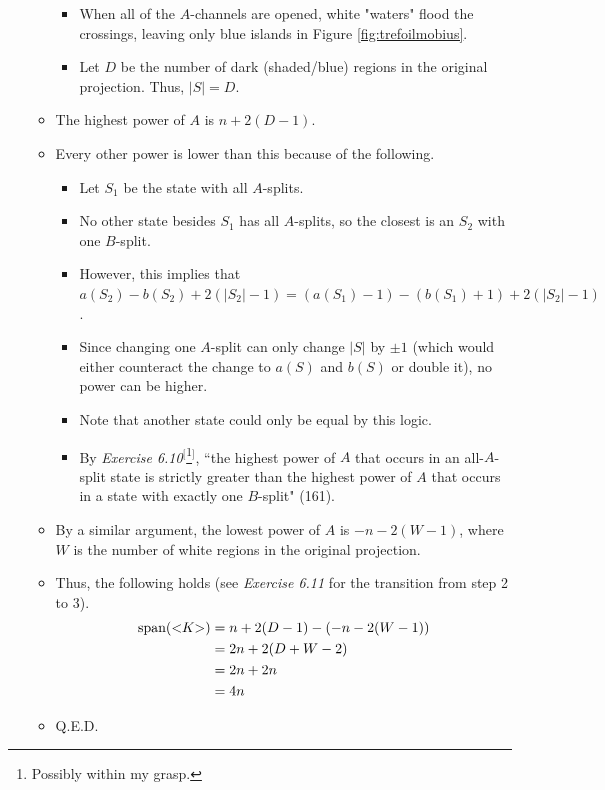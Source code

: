 \documentclass[titlepage]{article}
\numberwithin{figure}{section}
\numberwithin{table}{section}
\numberwithin{equation}{section}
\newcommand{\dq}[2]{``#1" (#2).}
\newcommand{\lbq}{<\hspace{-3pt}}
\newcommand{\rbq}{\hspace{-3pt}>}
\begin{document}
\begin{itemize}
\begin{itemize}
\begin{itemize}
            \item When all of the $A$-channels are opened, white "waters" flood the crossings, leaving only blue islands in Figure \ref{fig:trefoilmobius}.
            \item Let $D$ be the number of dark (shaded/blue) regions in the original projection. Thus, $|S|=D$.
        \end{itemize}
        \item The highest power of $A$ is $n+2(D-1)$.
        \item Every other power is lower than this because of the following.
        \begin{itemize}
            \item Let $S_1$ be the state with all $A$-splits.
            \item No other state besides $S_1$ has all $A$-splits, so the closest is an $S_2$ with one $B$-split.
            \item However, this implies that $a(S_2)-b(S_2)+2(|S_2|-1)=(a(S_1)-1)-(b(S_1)+1)+2(|S_2|-1)$.
            \item Since changing one $A$-split can only change $|S|$ by $\pm 1$ (which would either counteract the change to $a(S)$ and $b(S)$ or double it), no power can be higher.
            \item Note that another state could only be equal by this logic.
            \item By \emph{Exercise 6.10}$^[$\footnote{Possibly within my grasp.}$^]$, \dq{the highest power of $A$ that occurs in an all-$A$-split state is strictly greater than the highest power of $A$ that occurs in a state with exactly one $B$-split}{161}
        \end{itemize}
        \item By a similar argument, the lowest power of $A$ is $-n-2(W-1)$, where $W$ is the number of white regions in the original projection.
        \item Thus, the following holds (see \emph{Exercise 6.11} for the transition from step 2 to 3).
        \begin{align*}
            \text{span}(\lbq K\rbq) &= n+2(D-1)-(-n-2(W-1))\\
            &= 2n+2(D+W-2)\\
            &= 2n+2n\\
            &= 4n
        \end{align*}
        \item Q.E.D.
    \end{itemize}

\end{itemize}
\end{document}
